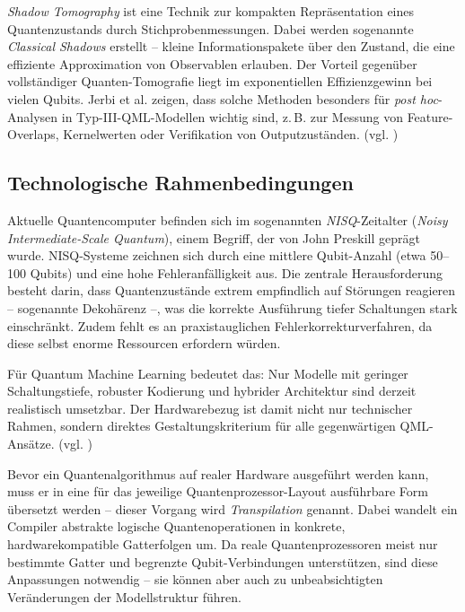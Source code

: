 \vspace{0.3cm}

\textit{Shadow Tomography} ist eine Technik zur kompakten Repräsentation eines Quantenzustands durch Stichprobenmessungen. Dabei werden sogenannte \textit{Classical Shadows} erstellt – kleine Informationspakete über den Zustand, die eine effiziente Approximation von Observablen erlauben. Der Vorteil gegenüber vollständiger Quanten-Tomografie liegt im exponentiellen Effizienzgewinn bei vielen Qubits. Jerbi et al. zeigen, dass solche Methoden besonders für \textit{post hoc}-Analysen in Typ-III-QML-Modellen wichtig sind, z.\,B. zur Messung von Feature-Overlaps, Kernelwerten oder Verifikation von Outputzuständen. (vgl. \cite{jerbi_quantum_2023})

\vspace{1cm}
\subsection{Technologische Rahmenbedingungen}  
Aktuelle Quantencomputer befinden sich im sogenannten \textit{NISQ}-Zeitalter (\textit{Noisy Intermediate-Scale Quantum}), einem Begriff, der von John Preskill geprägt wurde. NISQ-Systeme zeichnen sich durch eine mittlere Qubit-Anzahl (etwa 50–100 Qubits) und eine hohe Fehleranfälligkeit aus. Die zentrale Herausforderung besteht darin, dass Quantenzustände extrem empfindlich auf Störungen reagieren – sogenannte Dekohärenz –, was die korrekte Ausführung tiefer Schaltungen stark einschränkt. Zudem fehlt es an praxistauglichen Fehlerkorrekturverfahren, da diese selbst enorme Ressourcen erfordern würden.  

Für Quantum Machine Learning bedeutet das: Nur Modelle mit geringer Schaltungstiefe, robuster Kodierung und hybrider Architektur sind derzeit realistisch umsetzbar. Der Hardwarebezug ist damit nicht nur technischer Rahmen, sondern direktes Gestaltungskriterium für alle gegenwärtigen QML-Ansätze. (vgl. \cite{preskill_quantum_2018})

\vspace{0.3cm}

Bevor ein Quantenalgorithmus auf realer Hardware ausgeführt werden kann, muss er in eine für das jeweilige Quantenprozessor-Layout ausführbare Form übersetzt werden – dieser Vorgang wird \textit{Transpilation} genannt. Dabei wandelt ein Compiler abstrakte logische Quantenoperationen in konkrete, hardwarekompatible Gatterfolgen um. Da reale Quantenprozessoren meist nur bestimmte Gatter und begrenzte Qubit-Verbindungen unterstützen, sind diese Anpassungen notwendig – sie können aber auch zu unbeabsichtigten Veränderungen der Modellstruktur führen.

